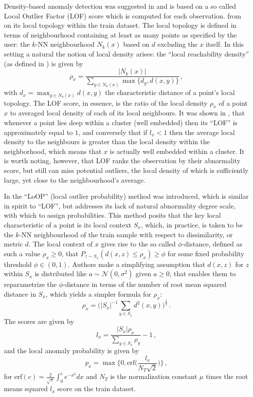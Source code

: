 \documentclass[a4paper,14pt]{extarticle}
\newcommand{\Ncal}{\mathcal{N}}
\begin{document}
Density-based anomaly detection was suggested in \cite{breunig2000} and is based
on a so called Local Outlier Factor (LOF) score which is computed for each observation.
from on its local topology within the train dataset. The local topology is defined
in terms of neighbourhood containing at least as many points as specified by the
user: the $k$-NN neighbourhood $N_k(x)$ based on $d$ excluding the $x$ itself. In
this setting a natural the notion of local density arises: the ``local reachability
density'' (as defined in \cite{breunig2000}) is given by
\begin{equation*}
    \rho_x = \frac{|N_k(x)|}{\sum_{y\in N_k(x)} \max\{d_y, d(x,y)\}} \,,
\end{equation*}
with $d_x = \max_{y\in N_k(x)} d(x, y)$ the characteristic distance of a point's
local topology. The LOF score, in essence, is the ratio of the local density $\rho_x$
of a point $x$ to averaged local density of each of its local neighbours. It was
shown in \cite{breunig2000}, that whenever a point lies deep within a cluster (well
embedded) then its ``LOF'' is approximately equal to $1$, and conversely that if
$l_x < 1$ then the average local density to the neighbours is greater than the
local density within the neighborhood, which means that $x$ is actually well embedded
within a cluster. It is worth noting, however, that LOF ranks the observation by
their abnormality score, but still can miss potential outliers, the local density
of which is sufficiently large, yet close to the neighbourhood's average.

In \cite{kriegel2009} the ``LoOP'' (local outlier probability) method was introduced,
which is similar in spirit to ``LOF'', but addresses its lack of natural abnormality
degree scale, with which to assign probabilities. This method posits that the key
local characteristic of a point is its local context $S_x$, which, in practice, is
taken to be the $k$-NN neighbourhood of the train sample with respect to dissimilarity,
or metric $d$. The local context of $x$ gives rise to the so called $\phi$-distance,
defined as such a value $\rho_x\geq 0$, that $P_{z\sim S_x}(d(x,z)\leq \rho_x)\geq \phi$
for some fixed probability threshold $\phi\in(0,1)$. Authors make a simplifying assumption
that $d(x,z)$ for $z$ within $S_x$ is distributed like $a\sim \Ncal(0, \sigma^2)$
given $a\geq0$, that enables them to reparametrize the $\phi$-distance in terms of
the number of root mean squared distance in $S_x$, which yields a simpler formula
for $\rho_x$:
\begin{equation*}
    \rho_x
    = \bigl(|S_x|^{-1} \sum_{y \in S_x} d^2(x, y)\bigr)^\frac{1}{2}
    \,.
\end{equation*}
The scores are given by 
$$ l_x = \frac{|S_x|\rho_x}{\sum_{y\in S_x} \rho_y}-1\,, $$
and the local anomaly probability is given by
$$ p_x = \max\bigl\{0, \text{erf}\bigl(\frac{l_x}{N_T\sqrt{2}}\bigr)\Bigr\}\,, $$
for $\text{erf}(c) = \frac{2}{\sqrt{\pi}} \int_0^c e^{-x^2} dx$ and $N_T$ is the
normalization constant $\mu$ times the root means squared $l_x$ score on the train
dataset.
\end{document}
